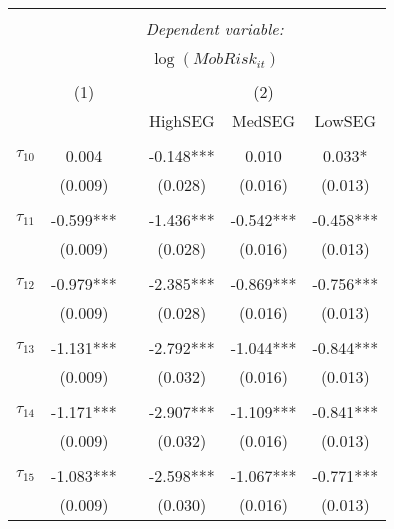 \begin{tabular}{@{\extracolsep{-5pt}}lccccc} 
\\[-1.8ex]\hline 
\hline \\[-1.8ex] 
 & \multicolumn{5}{c}{\textit{Dependent variable:}} \\ 
\cline{2-6} 
\\[-1.8ex] & \multicolumn{5}{c}{$\log(MobRisk_{it})$}\\ 
\\[-1.8ex] & (1) && \multicolumn{3}{c}{(2)} \\ 
\cline{2-2}\cline{4-6}
        &&& HighSEG & MedSEG & LowSEG  \\
 \\[-1.8ex] 
$\tau_{10}$     &   0.004   && -0.148*** &   0.010   &  0.033*   \\
                &  (0.009)  &&  (0.028)  &  (0.016)  &  (0.013)  \\
                &           &&           &           &           \\[-2.1ex]
$\tau_{11}$     & -0.599*** && -1.436*** & -0.542*** & -0.458*** \\
                &  (0.009)  &&  (0.028)  &  (0.016)  &  (0.013)  \\
                &           &&           &           &           \\[-2.1ex]
$\tau_{12}$     & -0.979*** && -2.385*** & -0.869*** & -0.756*** \\
                &  (0.009)  &&  (0.028)  &  (0.016)  &  (0.013)  \\
                &           &&           &           &           \\[-2.1ex]
$\tau_{13}$     & -1.131*** && -2.792*** & -1.044*** & -0.844*** \\
                &  (0.009)  &&  (0.032)  &  (0.016)  &  (0.013)  \\
                &           &&           &           &           \\[-2.1ex]
$\tau_{14}$     & -1.171*** && -2.907*** & -1.109*** & -0.841*** \\
                &  (0.009)  &&  (0.032)  &  (0.016)  &  (0.013)  \\
                &           &&           &           &           \\[-2.1ex]
$\tau_{15}$     & -1.083*** && -2.598*** & -1.067*** & -0.771*** \\
                &  (0.009)  &&  (0.030)  &  (0.016)  &  (0.013)  \\

\end{tabular}
